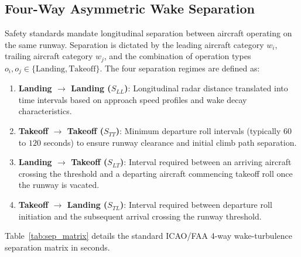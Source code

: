 \documentclass[10pt,journal,compsoc]{IEEEtran}
\begin{document}
\subsection{Four-Way Asymmetric Wake Separation}
Safety standards mandate longitudinal separation between aircraft operating on the same runway. Separation is dictated by the leading aircraft category $w_i$, trailing aircraft category $w_j$, and the combination of operation types $o_i, o_j \in \{\text{Landing}, \text{Takeoff}\}$. The four separation regimes are defined as:
\begin{enumerate}
    \item \textbf{Landing $\to$ Landing ($S_{LL}$)}: Longitudinal radar distance translated into time intervals based on approach speed profiles and wake decay characteristics.
    \item \textbf{Takeoff $\to$ Takeoff ($S_{TT}$)}: Minimum departure roll intervals (typically $60$ to $120$ seconds) to ensure runway clearance and initial climb path separation.
    \item \textbf{Landing $\to$ Takeoff ($S_{LT}$)}: Interval required between an arriving aircraft crossing the threshold and a departing aircraft commencing takeoff roll once the runway is vacated.
    \item \textbf{Takeoff $\to$ Landing ($S_{TL}$)}: Interval required between departure roll initiation and the subsequent arrival crossing the runway threshold.
\end{enumerate}

Table~\ref{tab:sep_matrix} details the standard ICAO/FAA 4-way wake-turbulence separation matrix in seconds.

\begin{table}[h]
\centering
\caption{ICAO/FAA Four-Way Asymmetric Wake-Turbulence Separation Matrix (in Seconds)}
\label{tab:sep_matrix}
\end{table}
\end{document}
